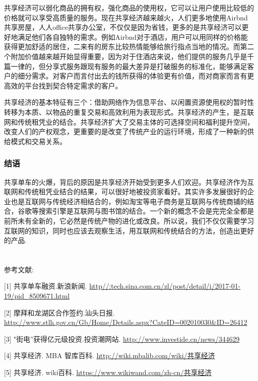 \documentclass[11pt]{ctexart} %
\begin{document}
共享经济可以弱化商品的拥有权，强化商品的使用权，它可以让用户使用比较低的价格就可以享受高质量的服务。现在共享经济越来越火，人们更多地使用Airbnd共享房屋，人人office共享办公室，不仅仅是因为省钱，更多的是共享经济可以更好地满足他们各自独特的需求。例如Airbnd对于酒店，用户可以用同样的价格能获得更加舒适的居住，二来有的房东比较热情能够给旅行指点当地的情况。而第二个附加价值越来越开始显得重要，因为对于住酒店来说，他们提供的服务几乎是千篇一律的，但分享式服务跟现有服务的最大差异是打破服务的标准化，能够满足客户的细分需求。对客户而言付出去的钱所获得的体验更有价值，而对商家而言有更高效的平台找到契合特定需求的客户。

共享经济的基本特征有三个：借助网络作为信息平台、以闲置资源使用权的暂时性转移为本质、以物品的重复交易和高效利用为表现形式。共享经济的产生，是互联网和传统租凭业的结合。共享经济扩大了交易主体的可选择空间和福利提升空间，改变人们的产权观念，更重要的是改变了传统产业的运行环境，形成了一种新的供给模式和交易关系。

\subsubsection*{结语}
  共享单车的火爆，背后的原因是共享经济开始受到更多人们欢迎。共享经济作为互联网和传统租凭业结合的结果，可以很好地被投资家看好。其实许多发展很好的企业也是互联网与传统经济相结合的，例如淘宝等电子商务是互联网与传统商铺的结合，谷歌等搜索引擎是互联网与图书馆的结合。一个新的概念不会是完完全全都是前所未有全新的，它必然是传统产物的进化或改良。所以说，我们不仅仅需要学习互联网的知识，同时也应该去观察生活，用互联网和传统结合的方法，创造出更好的产品.
\\ \\ \\ 参考文献:

[1] 共享单车融资.新浪新闻. \url{ http//:tech.sina.com.cn/zl/post/detail/i/2017-01-19/pid_8509671.html} 

[2] 摩拜和龙湖区合作签约.汕头日报. \url{http://www.stlh.gov.cn/Gb/Home/Details.aspx?CateID=002010030&ID=26412}

[3] "街电”获得亿元级投资.投资潮网站. \url{http://www.investide.cn/news/344629}

[4] 共享经济. MBA 智库百科. \url{http://wiki.mbalib.com/wiki/共享经济}

[5] 共享经济. wiki百科. \url{ https://www.wikiwand.com/zh-cn/共享经济}
\end{document}
